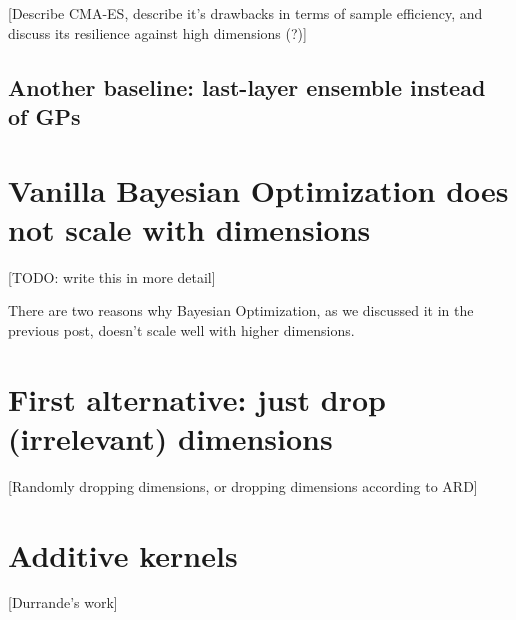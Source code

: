 \documentclass{article}
\begin{document}
[Describe CMA-ES, describe it's drawbacks in terms of sample efficiency, and discuss its resilience against high dimensions (?)]

\subsection*{Another baseline: last-layer ensemble instead of GPs}

\section*{Vanilla Bayesian Optimization does not scale with dimensions}

[TODO: write this in more detail]

There are two reasons why Bayesian Optimization, as we discussed it in the previous post, doesn't scale well with higher dimensions.

\section*{First alternative: just drop (irrelevant) dimensions}

[Randomly dropping dimensions, or dropping dimensions according to ARD]

\section*{Additive kernels}

[Durrande's work]





\end{document}
